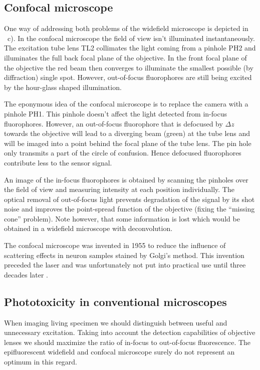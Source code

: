 \subsection{Confocal microscope}
One way of addressing both problems of the widefield microscope is
depicted in ~c). In the confocal
microscope the field of view isn't illuminated instantaneously.  The
excitation tube lens TL2 collimates the light coming from a pinhole
PH2 and illuminates the full back focal plane of the objective. In the
front focal plane of the objective the red beam then converges to
illuminate the smallest possible (by diffraction) single
spot. However, out-of-focus fluorophores are still being excited by
the hour-glass shaped illumination.

The eponymous idea of the confocal microscope is to replace the camera
with a pinhole PH1. This pinhole doesn't affect the light detected
from in-focus fluorophores. However, an out-of-focus fluorophore that
is defocused by $\Delta z$ towards the objective will lead to a
diverging beam (green) at the tube lens and will be imaged into a point
behind the focal plane of the tube lens. The pin hole only transmits a
part of the circle of confusion. Hence defocused fluorophores
contribute less to the sensor signal.

An image of the in-focus fluorophores is obtained by scanning the
pinholes over the field of view and measuring intensity at each
position individually. The optical removal of out-of-focus light
prevents degradation of the signal by its shot noise and improves the
point-spread function of the objective (fixing the ``missing cone''
problem). Note however, that some information is lost which would be
obtained in a widefield microscope with deconvolution.

The confocal microscope was invented in 1955  \citep{Minsky1961,Minsky1988} to reduce the influence of
scattering effects in neuron samples stained by Golgi's method. This
invention preceded the laser and was unfortunately not put into
practical use until three decades later \citep{Amos1987}.
\subsection{Phototoxicity in conventional microscopes}
When imaging living specimen we should distinguish between useful and
unnecessary excitation. Taking into account the detection capabilities
of objective lenses we should maximize the ratio of in-focus to
out-of-focus fluorescence. The epifluorescent widefield and confocal
microscope surely do not represent an optimum in this regard.

